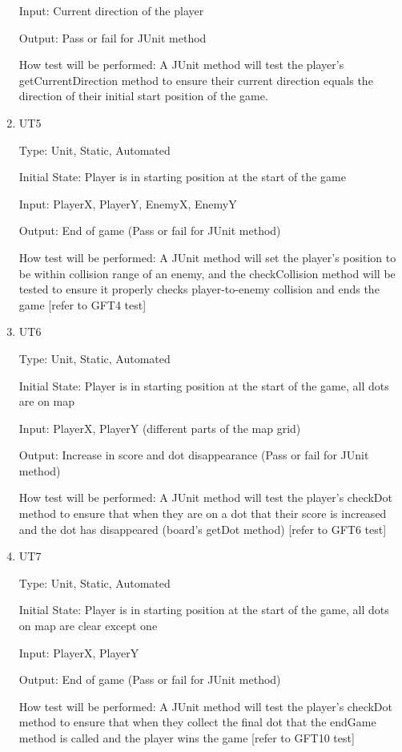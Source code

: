 \documentclass[12pt, titlepage]{article}
\begin{document}
\begin{enumerate}
Input: Current direction of the player
					
Output: Pass or fail for JUnit method
					
How test will be performed: A JUnit method will test the player's getCurrentDirection method to ensure their current direction equals the direction of their initial start position of the game.

\item{UT5\\}

Type: Unit, Static, Automated
					
Initial State: Player is in starting position at the start of the game
					
Input: PlayerX, PlayerY, EnemyX, EnemyY
					
Output: End of game (Pass or fail for JUnit method)
					
How test will be performed: A JUnit method will set the player's position to be within collision range of an enemy, and the checkCollision method will be tested to ensure it properly checks player-to-enemy collision and ends the game [refer to GFT4 test]

\item{UT6\\}

Type: Unit, Static, Automated
					
Initial State: Player is in starting position at the start of the game, all dots are on map
					
Input: PlayerX, PlayerY (different parts of the map grid)
					
Output: Increase in score and dot disappearance (Pass or fail for JUnit method)
					
How test will be performed: A JUnit method will test the player's checkDot method to ensure that when they are on a dot that their score is increased and the dot has disappeared (board's getDot method) [refer to GFT6 test]

\item{UT7\\}

Type: Unit, Static, Automated
					
Initial State: Player is in starting position at the start of the game, all dots on map are clear except one
					
Input: PlayerX, PlayerY
					
Output: End of game (Pass or fail for JUnit method)
					
How test will be performed: A JUnit method will test the player's checkDot method to ensure that when they collect the final dot that the endGame method is called and the player wins the game [refer to GFT10 test]


\end{enumerate}
\end{document}
